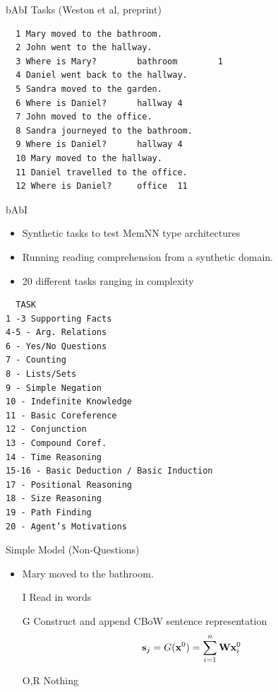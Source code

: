 \documentclass{beamer}
\begin{document}
\begin{frame}[fragile]{bAbI Tasks (Weston et al, preprint) }
\begin{verbatim}
  1 Mary moved to the bathroom.
  2 John went to the hallway.
  3 Where is Mary?        bathroom        1
  4 Daniel went back to the hallway.
  5 Sandra moved to the garden.
  6 Where is Daniel?      hallway 4
  7 John moved to the office.
  8 Sandra journeyed to the bathroom.
  9 Where is Daniel?      hallway 4
  10 Mary moved to the hallway.
  11 Daniel travelled to the office.
  12 Where is Daniel?     office  11
\end{verbatim}
\end{frame}

\begin{frame}{bAbI}
  \begin{itemize}
  \item Synthetic tasks to test MemNN type architectures
    \air
  \item Running reading comprehension from a synthetic domain.
    \air 
  \item 20 different tasks ranging in complexity
  \end{itemize}
\end{frame}

\begin{frame}[fragile]
\begin{verbatim}
  TASK
1 -3 Supporting Facts
4-5 - Arg. Relations
6 - Yes/No Questions
7 - Counting
8 - Lists/Sets
9 - Simple Negation
10 - Indefinite Knowledge
11 - Basic Coreference
12 - Conjunction
13 - Compound Coref.
14 - Time Reasoning
15-16 - Basic Deduction / Basic Induction
17 - Positional Reasoning
18 - Size Reasoning
19 - Path Finding
20 - Agent’s Motivations
\end{verbatim}
\end{frame}

\begin{frame}{Simple Model (Non-Questions)}
  \begin{itemize}
  \item Mary moved to the bathroom.
  \end{itemize}

  \begin{itemize}
  \item[I] Read in words
  \item[G] Construct and append CBoW sentence representation 
    \[\mathbf{s}_j =  G(\mathbf{x}^0) =  \sum_{i=1}^n \mathbf{W} \mathbf{x}^0_i\]
  \item[O,R] Nothing  
  \end{itemize}
\end{frame}
\end{document}
